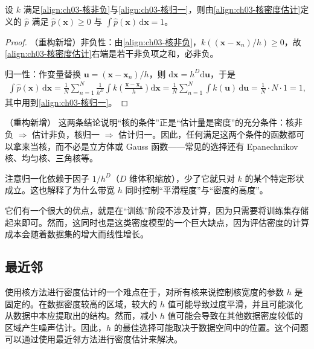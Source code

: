 \documentclass[../../main.tex]{subfiles}
\begin{document}
\begin{proposition}[核密度估计的归一性]\label{proposition:ch03-核密度归一}
设 $k$ 满足\eqref{align:ch03-核非负}与\eqref{align:ch03-核归一}，则由\eqref{align:ch03-核密度估计}定义的 $\hat{p}$ 满足 $\hat{p}(\boldsymbol{x})\geqslant0$ 与 $\int\hat{p}(\boldsymbol{x})\,\mathrm{d}\boldsymbol{x}=1$。
\end{proposition}
\begin{proof}
（重构新增）非负性：由\eqref{align:ch03-核非负}，$k((\boldsymbol{x}-\boldsymbol{x}_n)/h)\geqslant0$，故\eqref{align:ch03-核密度估计}右端是若干非负项之和，必非负。

归一性：作变量替换 $\boldsymbol{u}=(\boldsymbol{x}-\boldsymbol{x}_n)/h$，则 $\mathrm{d}\boldsymbol{x}=h^{D}\mathrm{d}\boldsymbol{u}$，于是
\begin{align*}
\int\hat{p}(\boldsymbol{x})\,\mathrm{d}\boldsymbol{x}=\frac{1}{N}\sum_{n=1}^{N}\frac{1}{h^{D}}\int k\!\left(\frac{\boldsymbol{x}-\boldsymbol{x}_n}{h}\right)\mathrm{d}\boldsymbol{x}=\frac{1}{N}\sum_{n=1}^{N}\int k(\boldsymbol{u})\,\mathrm{d}\boldsymbol{u}=\frac{1}{N}\cdot N\cdot1=1,
\end{align*}
其中用到\eqref{align:ch03-核归一}。
\end{proof}

\begin{remark}（重构新增）
这两条结论说明“核的条件”正是“估计量是密度”的充分条件：核非负 $\Rightarrow$ 估计非负，核归一 $\Rightarrow$ 估计归一。因此，任何满足这两个条件的函数都可以拿来当核，而不必是立方体或 Gauss 函数——常见的选择还有 Epanechnikov 核、均匀核、三角核等。

注意归一化依赖于因子 $1/h^{D}$（$D$ 维体积缩放），少了它就只对 $k$ 的某个特定形状成立。这也解释了为什么带宽 $h$ 同时控制“平滑程度”与“密度的高度”。
\end{remark}

它们有一个很大的优点，就是在“训练”阶段不涉及计算，因为只需要将训练集存储起来即可。然而，这同时也是这类密度模型的一个巨大缺点，因为评估密度的计算成本会随着数据集的增大而线性增长。

\subsection{最近邻}\label{subsection:ch03-最近邻}

使用核方法进行密度估计的一个难点在于，对所有核来说控制核宽度的参数 $h$ 是固定的。在数据密度较高的区域，较大的 $h$ 值可能导致过度平滑，并且可能淡化从数据中本应提取出的结构。然而，减小 $h$ 值可能会导致在其他数据密度较低的区域产生噪声估计。因此，$h$ 的最佳选择可能取决于数据空间中的位置。这个问题可以通过使用最近邻方法进行密度估计来解决。
\end{document}
